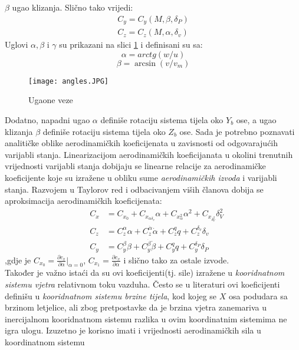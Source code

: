 $\beta$ ugao klizanja. Slično tako vrijedi:
\begin{eqnarray}
    C_y=C_y(M,\beta,\delta_P)\\
    C_z=C_z(M,\alpha,\delta_v)
\end{eqnarray}
Uglovi $\alpha, \beta$ i $\gamma$ su prikazani na slici \ref{fig:angles} i definisani su sa:
\begin{equation}
    \alpha=arctg(w/u)
\end{equation}
\begin{equation}
    \beta=\arcsin(v/v_m)
\end{equation}
\begin{figure}[ht!]
    \centering
    \texttt{[image: angles.JPG]}
    \caption{Ugaone veze}
    \label{fig:angles}
\end{figure}
Dodatno, napadni ugao $\alpha$ definiše rotaciju sistema tijela oko $Y_b$ ose, a ugao klizanja 
$\beta$ definiše rotaciju sistema tijela oko $Z_b$ ose. 
Sada je potrebno poznavati analitičke oblike aerodinamičkih koeficijenata u zavisnosti 
od odgovarajućih varijabli stanja. Linearizacijom aerodinamičkih koeficijanata u okolini trenutnih vrijednosti 
varijabli stanja dobijaju se linearne relacije za aerodinamičke koeficijente koje su 
izražene u obliku sume \textit{aerodinamičkih izvoda} i varijabli stanja.
Razvojem u Taylorov red i odbacivanjem viših članova dobija se aproksimacija 
aerodinamičkih koeficijenata:
\begin{eqnarray}
    &C_x&=C_{x_0}+C_{x_{\alpha\delta _v}}\alpha+C_{x_\alpha^2}\alpha^2+C_{x_{\delta _V^2}}{\delta_V^2}\\
   &C_z&=C_z^{\alpha}{\alpha} + C_z^{\dot{\alpha}} \dot{\alpha}+C_z^q q+C_z^{\delta _v}{\delta _v}\\
    &C_y&=C_y^{\beta}{\beta} + C_y^{\dot{\beta}} \dot{\beta}+C_y^q q+C_y^{\delta _P}{\delta _P}
\end{eqnarray}
,gdje je $C_{x_0}=\frac{\partial c_x}{\partial \alpha}|_{\alpha=0}$, $C_{x_1}=\frac{\partial c_x}{\partial \alpha}$ 
i slično tako za ostale izvode.\\
Također je važno istaći da su ovi koeficijenti(tj. sile) izražene u \textit{kooridnatnom sistemu vjetra} 
relativnom toku vazduha. Često se u literaturi ovi koeficijenti definišu u \textit{kooridnatnom sistemu brzine tijela}, kod kojeg se $X$ osa podudara sa 
brzinom letjelice, ali zbog pretpostavke da je brzina vjetra zanemariva u inercijalnom kooridnatnom sistemu razlika 
u ovim koordinatnim sistemima ne igra ulogu. 
Izuzetno je korisno imati i vrijednosti aerodinamičkih sila u koordinatnom sistemu 
